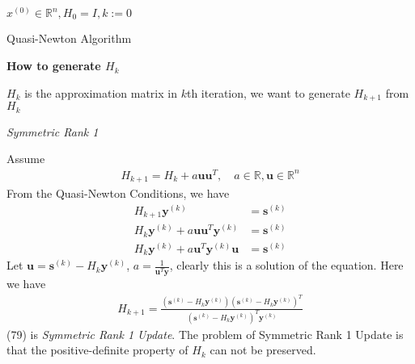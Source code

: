 \documentclass[runningheads]{llncs}
\begin{document}
\begin{algorithm}[H]
    \SetAlgoLined
     $x^{(0)} \in \mathbb{R}^n, H_0 = I, k:= 0$\;
     \caption{Quasi-Newton Algorithm}
\end{algorithm}
\vspace{.3em}
\noindent\textbf{How to generate $H_k$}
\par
$H_k$ is the approximation matrix in $k$th iteration, we want to
generate $H_{k+1}$ from $H_k$
\par
\vspace{.3em}
\noindent\textit{Symmetric Rank 1}
\par
Assume
\begin{align}
    H_{k+1} = H_k + a \mathbf{u}\mathbf{u}^T,
     \quad a \in \mathbb{R}, \mathbf{u} \in \mathbb{R}^n
\end{align}
From the Quasi-Newton Conditions, we have
\begin{align}
    H_{k+1} \mathbf{y}^{(k)} &= \mathbf{s}^{(k)} \\
    H_k \mathbf{y}^{(k)} + a \mathbf{u}\mathbf{u}^T \mathbf{y}^{(k)}
    &= \mathbf{s}^{(k)} \\
    H_k \mathbf{y}^{(k)} + a \mathbf{u}^T\mathbf{y}^{(k)} \mathbf{u} 
    &= \mathbf{s}^{(k)}
\end{align}
Let $\mathbf{u} = \mathbf{s}^{(k)} - H_k \mathbf{y}^{(k)}$, 
$a = \frac{1}{\mathbf{u}^T \mathbf{y}}$,
clearly this is a solution of the equation.
Here we have
\begin{align}
    H_{k+1} = \frac{(\mathbf{s}^{(k)} - H_k \mathbf{y}^{(k)})
    (\mathbf{s}^{(k)} - H_k \mathbf{y}^{(k)})^T}
    {(\mathbf{s}^{(k)} - H_k \mathbf{y}^{(k)})^T \mathbf{y}^{(k)}}
\end{align}
(79) is \textit{Symmetric Rank 1 Update}.
The problem of Symmetric Rank 1 Update is that
the positive-definite property of $H_k$
can not be preserved.
\end{document}
